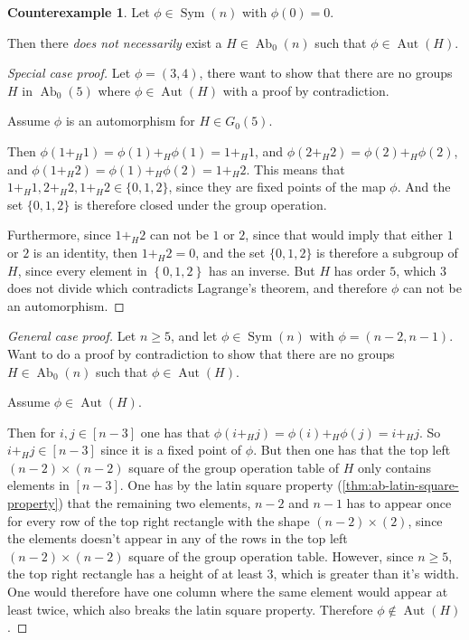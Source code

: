 \documentclass[a4paper, 12pt, english]{article}
\theoremstyle{plain}
\theoremstyle{definition}
\newtheorem{counterexample}[theorem]{Counterexample}
\newcommand{\set}[1]{ \left\{ #1 \right\} } %
\DeclareMathOperator{\Ab}{Ab}
\DeclareMathOperator{\Aut}{Aut}
\DeclareMathOperator{\Sym}{Sym}
\begin{document}
\begin{counterexample}
    Let \( \phi \in \Sym(n) \) with \( \phi(0) = 0 \).
    
    Then there \emph{does not necessarily} exist a \( H \in \Ab_0(n) \) such that \( \phi \in \Aut(H) \).
\end{counterexample}
\begin{proof}[Special case proof]
    Let \( \phi = (3, 4) \), there want to show that there are no groups \( H \) in \( \Ab_0(5) \) where \( \phi \in \Aut(H) \) with a proof by contradiction.

    Assume \( \phi \) is an automorphism for \( H \in G_0(5) \).

    Then \( \phi(1 +_H 1) = \phi(1) +_H \phi(1) = 1 +_H 1 \), and \( \phi(2 +_H 2) = \phi(2) +_H \phi(2) \), and \( \phi(1 +_H 2) = \phi(1) +_H \phi(2) = 1 +_H 2 \). This means that \( 1 +_H 1, 2 +_H 2, 1 +_H 2 \in \{0, 1, 2\} \), since they are fixed points of the map \( \phi \). And the set \( \{ 0, 1, 2 \} \) is therefore closed under the group operation.

    Furthermore, since \( 1 +_H 2 \) can not be \( 1 \) or \( 2 \), since that would imply that either \( 1 \) or \( 2 \) is an identity, then \( 1 +_H 2 = 0 \), and the set \( \{ 0, 1, 2 \} \) is therefore a subgroup of \( H \), since every element in \( \set{0, 1, 2} \) has an inverse. But \( H \) has order \( 5 \), which \( 3 \) does not divide which contradicts Lagrange's theorem, and therefore \( \phi \) can not be an automorphism.
\end{proof}
\begin{proof}[General case proof]
    Let \( n \geq 5 \), and let \( \phi \in \Sym(n) \) with \( \phi = (n-2, n-1) \). Want to do a proof by contradiction to show that there are no groups \( H \in \Ab_0(n) \) such that \( \phi \in \Aut(H) \).

    Assume \( \phi \in \Aut(H) \).

    Then for \( i, j \in [n-3] \) one has that \( \phi(i +_H j) = \phi(i) +_H \phi(j) = i +_H j \). So \( i +_H j \in [n - 3] \) since it is a fixed point of \( \phi \). But then one has that the top left \( (n - 2) \times (n - 2) \) square of the group operation table of \( H \) only contains elements in \( [n-3] \). One has by the latin square property (\autoref{thm:ab-latin-square-property}) that the remaining two elements, \( n - 2 \) and \( n - 1 \) has to appear once for every row of the top right rectangle with the shape \( (n - 2) \times (2) \), since the elements doesn't appear in any of the rows in the top left \( (n - 2) \times (n - 2) \) square of the group operation table. However, since \( n \geq 5 \), the top right rectangle has a height of at least \( 3 \), which is greater than it's width. One would therefore have one column where the same element would appear at least twice, which also breaks the latin square property. Therefore \( \phi \not\in \Aut(H) \).
\end{proof}
\end{document}
